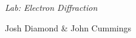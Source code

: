 {\LARGE {\em \noindent Lab: Electron Diffraction}}

\large{\noindent Josh Diamond \& John Cummings}


